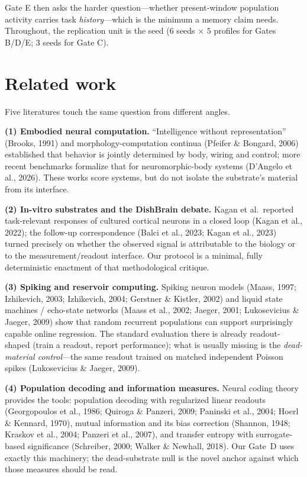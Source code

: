 \documentclass[12pt]{article}
\begin{document}
Gate E then asks the harder question---whether present-window population
activity carries task \emph{history}---which is the minimum a memory
claim needs. Throughout, the replication unit is the seed
($6$ seeds $\times$ $5$ profiles for Gates B/D/E; $3$ seeds for Gate C).

\section{Related work}\label{sec:related}

Five literatures touch the same question from different angles.

\textbf{(1) Embodied neural computation.} ``Intelligence without
representation'' (Brooks, 1991) and morphology-computation continua
(Pfeifer \& Bongard, 2006) established that behavior is jointly determined
by body, wiring and control; more recent benchmarks formalize that for
neuromorphic-body systems (D'Angelo et al., 2026). These works
score systems, but do not isolate the substrate's material from its
interface.

\textbf{(2) In-vitro substrates and the DishBrain debate.} Kagan et
al.\ reported task-relevant responses of cultured cortical neurons in a
closed loop (Kagan et al., 2022); the follow-up correspondence
(Balci et al., 2023; Kagan et al., 2023) turned precisely on whether
the observed signal is attributable to the biology or to the
measurement/readout interface. Our protocol is a minimal, fully
deterministic enactment of that methodological critique.

\textbf{(3) Spiking and reservoir computing.} Spiking neuron models
(Maass, 1997; Izhikevich, 2003; Izhikevich, 2004; Gerstner \& Kistler, 2002) and liquid
state machines / echo-state networks (Maass et al., 2002; Jaeger, 2001; Lukosevicius \& Jaeger, 2009) show that random recurrent populations
can support surprisingly capable online regression. The standard
evaluation there is already readout-shaped (train a readout, report
performance); what is usually missing is the \emph{dead-material
control}---the same readout trained on matched independent Poisson
spikes (Lukosevicius \& Jaeger, 2009).

\textbf{(4) Population decoding and information measures.} Neural
coding theory provides the tools: population decoding with regularized
linear readouts (Georgopoulos et al., 1986; Quiroga \& Panzeri, 2009; Paninski et al., 2004; Hoerl \& Kennard, 1970), mutual information and its bias correction
(Shannon, 1948; Kraskov et al., 2004; Panzeri et al., 2007), and transfer entropy with
surrogate-based significance (Schreiber, 2000; Walker \& Newhall, 2018). Our Gate~D
uses exactly this machinery; the dead-substrate null is the novel
anchor against which those measures should be read.
\end{document}
